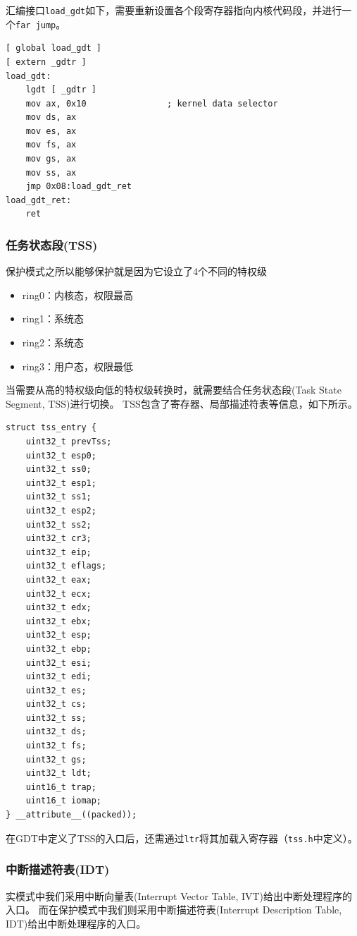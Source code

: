 \documentclass[logo,reportComp]{thesis}
\begin{document}
汇编接口\verb'load_gdt'如下，需要重新设置各个段寄存器指向内核代码段，并进行一个\verb'far jump'。
\begin{lstlisting}[language={[x86masm]Assembler}]
[ global load_gdt ]
[ extern _gdtr ]
load_gdt:
	lgdt [ _gdtr ]
	mov ax, 0x10                ; kernel data selector
	mov ds, ax
	mov es, ax
	mov fs, ax
	mov gs, ax
	mov ss, ax
	jmp 0x08:load_gdt_ret
load_gdt_ret:
	ret
\end{lstlisting}

\subsubsection{任务状态段(TSS)}
\label{sub:tss}
保护模式之所以能够保护就是因为它设立了4个不同的特权级
\begin{itemize}
	\item ring0：内核态，权限最高
	\item ring1：系统态
	\item ring2：系统态
	\item ring3：用户态，权限最低
\end{itemize}

当需要从高的特权级向低的特权级转换时，就需要结合任务状态段(Task State Segment, TSS)进行切换。
TSS包含了寄存器、局部描述符表等信息，如下所示。
\begin{lstlisting}
struct tss_entry {
	uint32_t prevTss;
	uint32_t esp0;
	uint32_t ss0;
	uint32_t esp1;
	uint32_t ss1;
	uint32_t esp2;
	uint32_t ss2;
	uint32_t cr3;
	uint32_t eip;
	uint32_t eflags;
	uint32_t eax;
	uint32_t ecx;
	uint32_t edx;
	uint32_t ebx;
	uint32_t esp;
	uint32_t ebp;
	uint32_t esi;
	uint32_t edi;
	uint32_t es;
	uint32_t cs;
	uint32_t ss;
	uint32_t ds;
	uint32_t fs;
	uint32_t gs;
	uint32_t ldt;
	uint16_t trap;
	uint16_t iomap;
} __attribute__((packed));
\end{lstlisting}

在GDT中定义了TSS的入口后，还需通过\verb'ltr'将其加载入寄存器（\verb'tss.h'中定义）。

\subsubsection{中断描述符表(IDT)}
实模式中我们采用中断向量表(Interrupt Vector Table, IVT)给出中断处理程序的入口。
而在保护模式中我们则采用中断描述符表(Interrupt Description Table, IDT)给出中断处理程序的入口。
\end{document}
